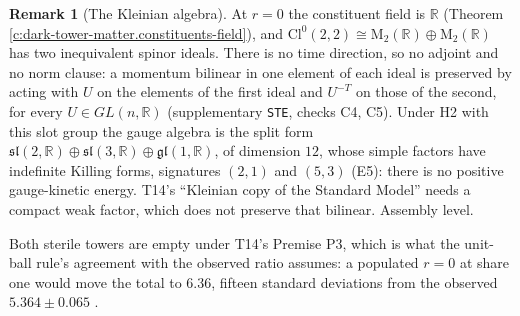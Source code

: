\documentclass[11pt]{article}
\theoremstyle{definition}
\newtheorem{remark}[theorem]{Remark}
\theoremstyle{plain}
\providecommand{\Cl}{}\renewcommand{\Cl}{\mathrm{Cl}}
\providecommand{\Mat}{}\renewcommand{\Mat}{\mathrm{M}}
\providecommand{\R}{}\renewcommand{\R}{\mathbb{R}}
\providecommand{\gl}{}\renewcommand{\gl}{\mathfrak{gl}}
\providecommand{\sll}{}\renewcommand{\sll}{\mathfrak{sl}}
\providecommand{\file}{}\renewcommand{\file}[1]{\texttt{#1}}
\begin{document}
\begin{remark}[The Kleinian algebra]\label{c:note.dark-tower-matter.kleinian-algebra}
At $r = 0$ the constituent field is $\R$ (Theorem \ref{c:dark-tower-matter.constituents-field}), and $\Cl^{0}(2,2) \cong \Mat_{2}(\R) \oplus \Mat_{2}(\R)$ has two inequivalent spinor ideals. There is no time direction, so no adjoint and no norm clause: a momentum bilinear in one element of each ideal is preserved by acting with $U$ on the elements of the first ideal and $U^{-T}$ on those of the second, for every $U \in GL(n,\R)$ (supplementary \file{STE}, checks C4, C5). Under H2 with this slot group the gauge algebra is the split form $\sll(2,\R) \oplus \sll(3,\R) \oplus \gl(1,\R)$, of dimension $12$, whose simple factors have indefinite Killing forms, signatures $(2,1)$ and $(5,3)$ (E5): there is no positive gauge-kinetic energy. T14's ``Kleinian copy of the Standard Model'' \cite[Cor.~3.11]{ButlerT14} needs a compact weak factor, which does not preserve that bilinear. Assembly level.
\end{remark}

\label{c:note.dark-tower-matter.setting-sterile-towers}
Both sterile towers are empty under T14's Premise P3, which is what the unit-ball rule's agreement with the observed ratio assumes: a populated $r = 0$ at share one would move the total to $6.36$, fifteen standard deviations from the observed $5.364 \pm 0.065$ \cite{Planck2018}.
\end{document}
